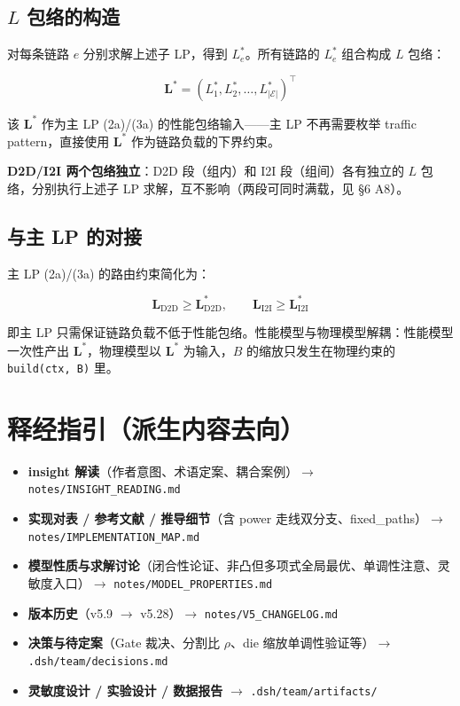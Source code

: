 \documentclass[11pt]{article}
\newcommand{\bv}{\mathbf}
\newcommand{\E}{\mathcal{E}}
\begin{document}
\subsection{$L$ 包络的构造}

对每条链路 $e$ 分别求解上述子 LP，得到 $L_e^{*}$。所有链路的 $L_e^{*}$ 组合构成 $L$ 包络：

\begin{equation}
\bv{L}^{*} = (L_1^{*}, L_2^{*}, \dots, L_{|\E|}^{*})^{\top}
\end{equation}

该 $\bv{L}^{*}$ 作为主 LP (2a)/(3a) 的性能包络输入——主 LP 不再需要枚举 traffic pattern，直接使用 $\bv{L}^{*}$ 作为链路负载的下界约束。

\textbf{D2D/I2I 两个包络独立}：D2D 段（组内）和 I2I 段（组间）各有独立的 $L$ 包络，分别执行上述子 LP 求解，互不影响（两段可同时满载，见 §6 A8）。

\subsection{与主 LP 的对接}

主 LP (2a)/(3a) 的路由约束简化为：

\begin{equation}
\bv{L}_{\text{D2D}} \ge \bv{L}_{\text{D2D}}^{*},\qquad \bv{L}_{\text{I2I}} \ge \bv{L}_{\text{I2I}}^{*}
\end{equation}

即主 LP 只需保证链路负载不低于性能包络。性能模型与物理模型解耦：性能模型一次性产出 $\bv{L}^{*}$，物理模型以 $\bv{L}^{*}$ 为输入，$B$ 的缩放只发生在物理约束的 \texttt{build(ctx, B)} 里。

\section*{释经指引（派生内容去向）}

\begin{itemize}
\item \textbf{insight 解读}（作者意图、术语定案、耦合案例）$\to$ \texttt{notes/INSIGHT\_READING.md}
\item \textbf{实现对表 / 参考文献 / 推导细节}（含 power 走线双分支、fixed\_paths）$\to$ \texttt{notes/IMPLEMENTATION\_MAP.md}
\item \textbf{模型性质与求解讨论}（闭合性论证、非凸但多项式全局最优、单调性注意、灵敏度入口）$\to$ \texttt{notes/MODEL\_PROPERTIES.md}
\item \textbf{版本历史}（v5.9 $\to$ v5.28）$\to$ \texttt{notes/V5\_CHANGELOG.md}
\item \textbf{决策与待定案}（Gate 裁决、分割比 $\rho$、die 缩放单调性验证等）$\to$ \texttt{.dsh/team/decisions.md}
\item \textbf{灵敏度设计 / 实验设计 / 数据报告} $\to$ \texttt{.dsh/team/artifacts/}
\end{itemize}
\end{document}
